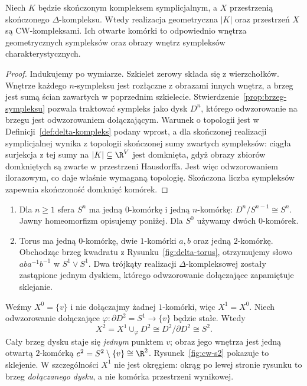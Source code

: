 \begin{stwierdzenie}
\label{prop:sympleksy-cw}
Niech $K$ będzie skończonym kompleksem
symplicjalnym, a $X$ przestrzenią
skończonego $\Delta$-kompleksu.
Wtedy realizacja geometryczna $|K|$
oraz przestrzeń $X$ są CW-kompleksami.
Ich otwarte komórki to odpowiednio
wnętrza geometrycznych sympleksów
oraz obrazy wnętrz sympleksów charakterystycznych.
\end{stwierdzenie}
\begin{proof}
Indukujemy po wymiarze. Szkielet
zerowy składa się z wierzchołków.
Wnętrze każdego $n$-sympleksu
jest rozłączne z obrazami innych
wnętrz, a brzeg jest sumą ścian
zawartych w poprzednim szkielecie.
Stwierdzenie~\ref{prop:brzeg-sympleksu}
pozwala traktować sympleks
jako dysk $D^n$, którego
odwzorowanie na brzegu jest odwzorowaniem dołączającym.
Warunek o topologii jest w
Definicji~\ref{def:delta-kompleks}
podany wprost, a dla skończonej
realizacji symplicjalnej wynika
z topologii skończonej sumy zwartych sympleksów:
ciągła surjekcja z tej sumy na $|K|\subseteq\R^V$ jest domknięta,
gdyż obrazy zbiorów domkniętych są zwarte w przestrzeni Hausdorffa.
Jest więc odwzorowaniem ilorazowym, co daje właśnie wymaganą topologię.
Skończona liczba sympleksów
zapewnia skończoność domknięć komórek.
\end{proof}

\begin{przyklad}
\label{prz:cw-sfera-torus}
\begin{enumerate}[label=(\arabic*),leftmargin=*]
\item Dla $n\geq1$ sfera $S^n$
      ma jedną $0$-komórkę i jedną
      $n$-komórkę:
      $D^n/S^{n-1}\cong S^n$.
      Jawny homeomorfizm opisujemy
      poniżej.
      Dla $S^0$ używamy dwóch
      $0$-komórek.
\item Torus ma jedną $0$-komórkę,
      dwie $1$-komórki $a,b$ oraz
      jedną $2$-komórkę. Obchodząc
      brzeg kwadratu z
      Rysunku~\ref{fig:delta-torus},
      otrzymujemy słowo
      $aba^{-1}b^{-1}$ w
      $S^1\vee S^1$.
      Dwa trójkąty realizacji
      $\Delta$-kompleksowej zostały
      zastąpione jednym dyskiem,
      którego odwzorowanie dołączające
      zapamiętuje sklejanie.
\end{enumerate}
\end{przyklad}

\begin{przyklad}
\label{prz:cw-s2}
Weźmy $X^0=\{v\}$ i nie dołączajmy
żadnej $1$-komórki, więc $X^1=X^0$.
Niech odwzorowanie dołączające
$\varphi:\partial D^2=S^1\to\{v\}$
będzie stałe. Wtedy
\[
 X^2=X^1\cup_\varphi D^2
 \cong D^2/\partial D^2\cong S^2.
\]
Cały brzeg dysku staje się \emph{jednym}
punktem $v$; obraz jego wnętrza
jest jedną otwartą $2$-komórką
$e^2=S^2\setminus\{v\}\cong\R^2$.
Rysunek~\ref{fig:cw-s2} pokazuje to
sklejenie. W szczególności
$X^1$ nie jest okręgiem:
okrąg po lewej stronie rysunku
to brzeg \emph{dołączanego dysku},
a nie komórka przestrzeni wynikowej.
\end{przyklad}

